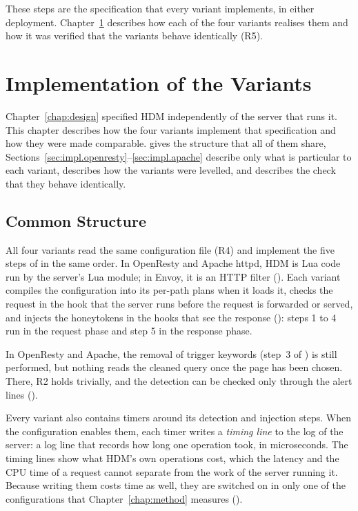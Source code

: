 \documentclass{rptuma}
\begin{document}
These steps are the specification that every variant implements, in either deployment.
Chapter~\ref{chap:impl} describes how each of the four variants realises them and how it was
verified that the variants behave identically (R5).

\chapter{Implementation of the Variants}
\label{chap:impl}

Chapter~\ref{chap:design} specified HDM independently of the server that runs it. This chapter describes
how the four variants implement that specification and how they were made comparable.
 gives the structure that all of them share,
Sections~\ref{sec:impl.openresty}--\ref{sec:impl.apache} describe only what is particular to each
variant,  describes how the variants were levelled, and
 describes the check that they behave identically.

\section{Common Structure}
\label{sec:impl.common}

All four variants read the same configuration file (R4) and implement the five steps of
 in the same order. In OpenResty and Apache httpd, HDM is Lua code
run by the server's Lua module; in Envoy, it is an HTTP filter ().
Each variant compiles the configuration into its per-path plans when it loads it, checks the request
in the hook that the server runs before the request is forwarded or served, and injects the
honeytokens in the hooks that see the response (): steps 1 to 4 run
in the request phase and step 5 in the response phase.

In OpenResty and Apache, the removal of trigger keywords (step~3 of
) is still performed, but nothing reads the cleaned query once the
page has been chosen. There, R2 holds trivially, and the detection can be checked only through the
alert lines ().

Every variant also contains timers around its detection and injection steps. When the
configuration enables them, each timer writes a \emph{timing line} to the log of the server: a
log line that records how long one operation took, in microseconds. The timing lines show what
HDM's own operations cost, which the latency and the CPU time of a request cannot separate from the
work of the server running it. Because writing them costs time as well, they are switched on in only one
of the configurations that Chapter~\ref{chap:method} measures ().
\end{document}
